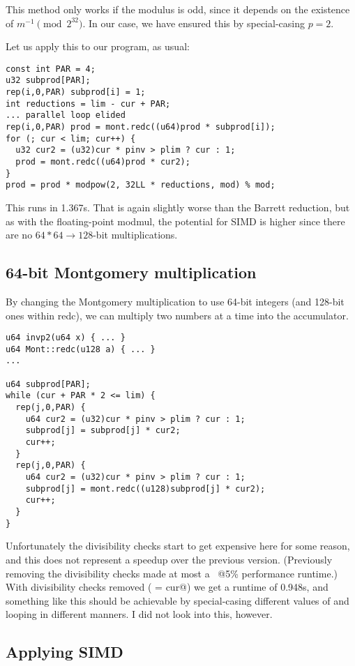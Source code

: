This method only works if the modulus is odd, since it depends on the existence of $m^{-1} \pmod{2^{32}}$. In our case, we have ensured this by special-casing $p = 2$.

Let us apply this to our program, as usual:
\begin{lstlisting}
const int PAR = 4;
u32 subprod[PAR];
rep(i,0,PAR) subprod[i] = 1;
int reductions = lim - cur + PAR;
... parallel loop elided
rep(i,0,PAR) prod = mont.redc((u64)prod * subprod[i]);
for (; cur < lim; cur++) {
  u32 cur2 = (u32)cur * pinv > plim ? cur : 1;
  prod = mont.redc((u64)prod * cur2);
}
prod = prod * modpow(2, 32LL * reductions, mod) % mod;
\end{lstlisting}
This runs in 1.367s.
That is again slightly worse than the Barrett reduction, but as with the floating-point modmul, the potential for SIMD is higher since there are no \mbox{$64*64\rightarrow128$}-bit multiplications.

\subsection{64-bit Montgomery multiplication}

By changing the Montgomery multiplication to use 64-bit integers (and 128-bit ones within redc),
we can multiply two numbers at a time into the accumulator.

\begin{lstlisting}
u64 invp2(u64 x) { ... }
u64 Mont::redc(u128 a) { ... }
...

u64 subprod[PAR];
while (cur + PAR * 2 <= lim) {
  rep(j,0,PAR) {
    u64 cur2 = (u32)cur * pinv > plim ? cur : 1;
    subprod[j] = subprod[j] * cur2;
    cur++;
  }
  rep(j,0,PAR) {
    u64 cur2 = (u32)cur * pinv > plim ? cur : 1;
    subprod[j] = mont.redc((u128)subprod[j] * cur2);
    cur++;
  }
}
\end{lstlisting}

Unfortunately the divisibility checks start to get expensive here for some reason, and this does not represent a speedup over the previous version.
(Previously removing the divisibility checks made at most a \verb@~@5\% performance runtime.)
With divisibility checks removed ( = cur@) we get a runtime of 0.948s, and something like this should be achievable
by special-casing different values of \verb@p@ and looping in different manners.
I did not look into this, however.

\subsection{Applying SIMD}

